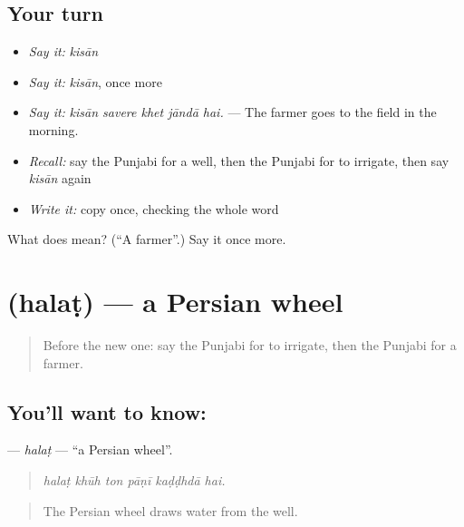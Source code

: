 \subsection*{Your turn}
\begin{itemize}
\raggedright
  \item \emph{Say it:} \emph{kisān}
  \item \emph{Say it:} \emph{kisān}, once more
  \item \emph{Say it:} \emph{kisān savere khet jāndā hai.} — The farmer goes to the field in the morning.
  \item \emph{Recall:} say the Punjabi for a well, then the Punjabi for to irrigate, then say \emph{kisān} again
  \item \emph{Write it:} copy \textbf{} once, checking the whole word
\end{itemize}

\begin{tcolorbox}[breakable,colback=teal!4,colframe=teal!35!black,title={Before you move on}]
What does  mean? (\textquotedblleft{}A farmer\textquotedblright{}.) Say it once more.
\end{tcolorbox}
\section[\texorpdfstring{\pa{ਹਲਟ} (halaṭ)}{ਹਲਟ (halaṭ)}]{ (halaṭ) — a Persian wheel}

\label{lesson:PA-C303-halat}



\begin{quote}
Before the new one: say the Punjabi for to irrigate, then the Punjabi for a farmer.
\end{quote}

\subsection*{You'll want to know: }
\textbf{} — \emph{halaṭ} — \textquotedblleft{}a Persian wheel\textquotedblright{}.

\begin{quote}
     
\end{quote}

\begin{quote}
\emph{halaṭ khūh ton pāṇī kaḍḍhdā hai.}
\end{quote}

\begin{quote}
The Persian wheel draws water from the well.
\end{quote}


